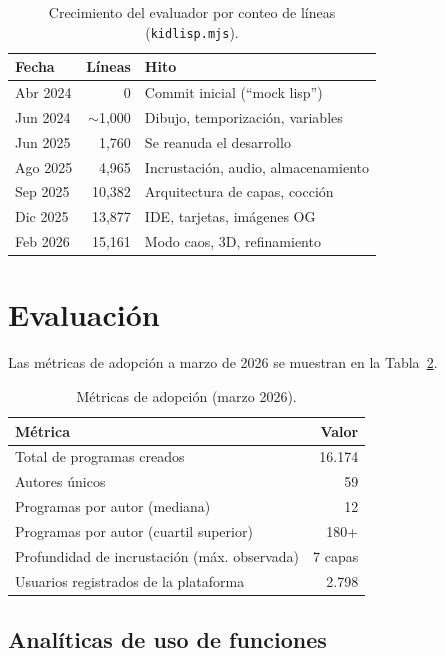 \documentclass[10pt,letterpaper,twocolumn]{article}
\begin{document}
\begin{table}[h]
\small
\centering
\begin{tabular}{lrl}
\toprule
\textbf{Fecha} & \textbf{Líneas} & \textbf{Hito} \\
\midrule
Abr 2024 & 0 & Commit inicial (``mock lisp'') \\
Jun 2024 & $\sim$1{,}000 & Dibujo, temporización, variables \\
Jun 2025 & 1{,}760 & Se reanuda el desarrollo \\
Ago 2025 & 4{,}965 & Incrustación, audio, almacenamiento \\
Sep 2025 & 10{,}382 & Arquitectura de capas, cocción \\
Dic 2025 & 13{,}877 & IDE, tarjetas, imágenes OG \\
Feb 2026 & 15{,}161 & Modo caos, 3D, refinamiento \\
\bottomrule
\end{tabular}
\caption{Crecimiento del evaluador por conteo de líneas (\texttt{kidlisp.mjs}).}
\label{tab:growth}
\end{table}


\section{Evaluación}
\label{sec:evaluation}

Las métricas de adopción a marzo de 2026 se muestran en la Tabla~\ref{tab:adoption}.

\begin{table}[h]
\small
\centering
\begin{tabular}{lr}
\toprule
\textbf{Métrica} & \textbf{Valor} \\
\midrule
Total de programas creados & 16.174 \\
Autores únicos & 59 \\
Programas por autor (mediana) & 12 \\
Programas por autor (cuartil superior) & 180+ \\
Profundidad de incrustación (máx. observada) & 7 capas \\
Usuarios registrados de la plataforma & 2.798 \\
\bottomrule
\end{tabular}
\caption{Métricas de adopción (marzo 2026).}
\label{tab:adoption}
\end{table}

\subsection{Analíticas de uso de funciones}
\end{document}
